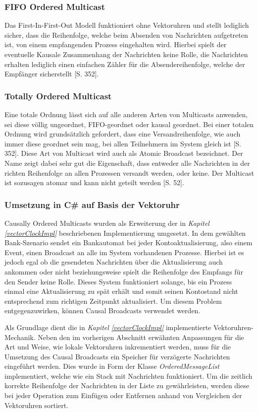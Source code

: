 \subsubsection*{FIFO Ordered Multicast}
Das First-In-First-Out Modell funktioniert ohne Vektoruhren und stellt lediglich sicher, dass die Reihenfolge, welche beim Absenden von Nachrichten aufgetreten ist, von einem empfangenden Prozess eingehalten wird. Hierbei spielt der eventuelle Kausale Zusammenhang der Nachrichten keine Rolle, die Nachrichten erhalten lediglich einen einfachen Zähler für die Absendereihenfolge, welche der Empfänger sicherstellt \cite{Tanenbaum2007}[S. 352].

\subsubsection*{Totally Ordered Multicast}
Eine totale Ordnung lässt sich auf alle anderen Arten von Multicasts anwenden, sei diese völlig ungeordnet, FIFO-geordnet oder kausal geordnet. Bei einer totalen Ordnung wird grundsätzlich gefordert, dass eine Versandreihenfolge, wie auch immer diese geordnet sein mag, bei allen Teilnehmern im System gleich ist \cite{Tanenbaum2007}[S. 352]. Diese Art von Multicast wird auch als Atomic Broadcast bezeichnet. Der Name zeigt dabei sehr gut die Eigenschaft, dass entweder alle Nachrichten in der richten Reihenfolge an allen Prozessen versandt werden, oder keine. Der Multicast ist sozusagen atomar und kann nicht geteilt werden \cite{Birman:1987:RCP:7351.7478}[S. 52].

\subsubsection{Umsetzung in C\# auf Basis der Vektoruhr}
Causally Ordered Multicasts wurden als Erweiterung der in \textit{Kapitel \ref{vectorClockImpl}} beschriebenen Implementierung umgesetzt. In dem gewählten Bank-Szenario sendet ein Bankautomat bei jeder Kontoaktualisierung, also einem Event, einen Broadcast an alle im System vorhandenen Prozesse. Hierbei ist es jedoch egal ob die gesendeten Nachrichten über die Aktualisierung auch ankommen oder nicht beziehungsweise spielt die Reihenfolge des Empfangs für den Sender keine Rolle. Dieses System funktioniert solange, bis ein Prozess einmal eine Aktualisierung zu spät erhält und somit seinen Kontostand nicht entsprechend zum richtigen Zeitpunkt aktualisiert. Um diesem Problem entgegenzuwirken, können Causal Broadcasts verwendet werden.

Als Grundlage dient die in \textit{Kapitel \ref{vectorClockImpl}} implementierte Vektoruhren-Mechanik. Neben den im vorherigen Abschnitt erwähnten Anpassungen für die Art und Weise, wie lokale Vektoruhren inkrementiert werden, muss für die Umsetzung des Causal Broadcasts ein Speicher für verzögerte Nachrichten eingeführt werden. Dies wurde in Form der Klasse \textit{OrderedMessageList} implementiert, welche wie ein Stack mit Nachrichten funktioniert. Um die zeitlich korrekte Reihenfolge der Nachrichten in der Liste zu gewährleisten, werden diese bei jeder Operation zum Einfügen oder Entfernen anhand von Vergleichen der Vektoruhren sortiert. 

